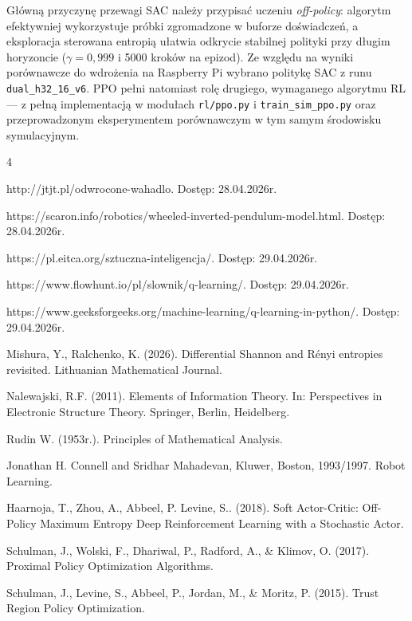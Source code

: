 \documentclass[12pt,twoside]{article}
\begin{document}
Główną przyczynę przewagi SAC należy przypisać uczeniu \emph{off-policy}: algorytm efektywniej wykorzystuje próbki zgromadzone w buforze doświadczeń, a eksploracja sterowana entropią ułatwia odkrycie stabilnej polityki przy długim horyzoncie ($\gamma = 0{,}999$ i 5000 kroków na epizod). Ze względu na wyniki porównawcze do wdrożenia na Raspberry Pi wybrano politykę SAC z runu \texttt{dual\_h32\_16\_v6}. PPO pełni natomiast rolę drugiego, wymaganego algorytmu RL --- z pełną implementacją w modułach \texttt{rl/ppo.py} i \texttt{train\_sim\_ppo.py} oraz przeprowadzonym eksperymentem porównawczym w tym samym środowisku symulacyjnym.

\clearpage


\begin{thebibliography}{4}


http://jtjt.pl/odwrocone-wahadlo. Dostęp: 28.04.2026r.

https://scaron.info/robotics/wheeled-inverted-pendulum-model.html. Dostęp: 28.04.2026r.

https://pl.eitca.org/sztuczna-inteligencja/. Dostęp: 29.04.2026r.

https://www.flowhunt.io/pl/slownik/q-learning/. Dostęp: 29.04.2026r.

https://www.geeksforgeeks.org/machine-learning/q-learning-in-python/. Dostęp: 29.04.2026r.

Mishura, Y., Ralchenko, K. (2026). Differential Shannon and Rényi entropies revisited. Lithuanian Mathematical Journal.

Nalewajski, R.F. (2011). Elements of Information Theory. In: Perspectives in Electronic Structure Theory. Springer, Berlin, Heidelberg.

Rudin W. (1953r.). Principles of Mathematical Analysis.

Jonathan H. Connell and Sridhar Mahadevan, Kluwer, Boston, 1993/1997. Robot Learning.

Haarnoja, T., Zhou, A., Abbeel, P. Levine, S.. (2018). Soft Actor-Critic: Off-Policy Maximum Entropy Deep Reinforcement Learning with a Stochastic Actor. 

Schulman, J., Wolski, F., Dhariwal, P., Radford, A., & Klimov, O. (2017). Proximal Policy Optimization Algorithms.

Schulman, J., Levine, S., Abbeel, P., Jordan, M., & Moritz, P. (2015). Trust Region Policy Optimization.


\end{thebibliography}
\end{document}
